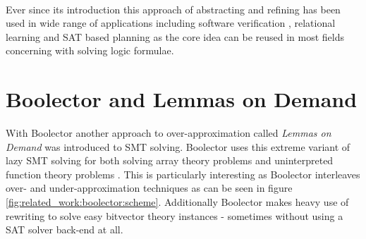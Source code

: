 \paragraph{}
Ever since its introduction this approach of abstracting and refining has been used in wide range of applications including software verification \cite{CEGAR}, relational learning \cite{CEGAR-Relational-Learning} and SAT based planning \cite{CEGAR-Planning} as the core idea can be reused in most fields concerning with solving logic formulae.



\section{Boolector and Lemmas on Demand}
\label{par:related_work:boolector}
With Boolector \cite{Brummayer-Biere2009_Chapter_BoolectorAnEfficientSMTSolverF} another approach to over-approximation called \textit{Lemmas on Demand} was introduced to SMT solving. Boolector uses this extreme variant of lazy SMT solving for both solving array theory problems \cite{p6-brummayer} and uninterpreted function theory problems \cite{NiemetzPreinerBiere-FMCAD14}.
This is particularly interesting as Boolector interleaves over- and under-approximation techniques as can be seen in figure \ref{fig:related_work:boolector:scheme}.
Additionally Boolector makes heavy use of rewriting to solve easy bitvector theory instances - sometimes without using a SAT solver back-end at all.
